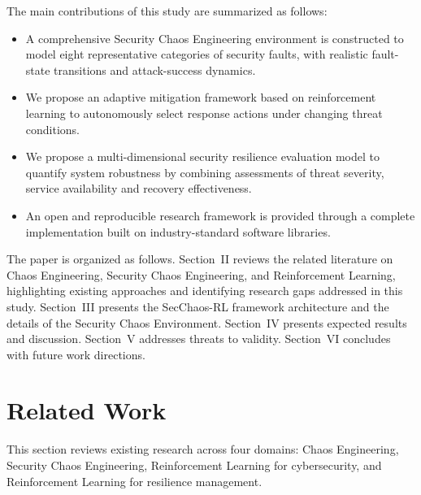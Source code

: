 \documentclass[pdflatex,sn-mathphys-num]{sn-jnl}%
\theoremstyle{thmstyleone}%
\theoremstyle{thmstyletwo}%
\theoremstyle{thmstylethree}%
\begin{document}
	The main contributions of this study are summarized as follows:
	\begin{itemize}
		\item A comprehensive Security Chaos Engineering environment is constructed to model eight representative categories of security faults, with realistic fault-state transitions and attack-success dynamics. 
		\item We propose an adaptive mitigation framework based on reinforcement learning to autonomously select response actions under changing threat conditions. 
		\item We propose a multi-dimensional security resilience evaluation model to quantify system robustness by combining assessments of threat severity, service availability and recovery effectiveness. 
		\item An open and reproducible research framework is provided through a complete implementation built on industry-standard software libraries. 
	\end{itemize}
	
	The paper is organized as follows. Section~II reviews the related literature on Chaos Engineering, Security Chaos Engineering, and Reinforcement Learning, highlighting existing approaches and identifying research gaps addressed in this study. Section~III presents the SecChaos-RL framework architecture and the details of the Security Chaos Environment. Section~IV presents expected results and discussion. Section~V addresses threats to validity. Section~VI concludes with future work directions.
	
	\section{Related Work}
	
	This section reviews existing research across four domains: Chaos Engineering, Security Chaos Engineering, Reinforcement Learning for cybersecurity, and Reinforcement Learning for resilience management.
	
\end{document}
